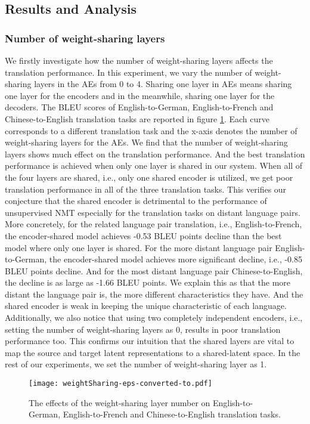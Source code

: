 \documentclass[11pt,a4paper]{article}
\begin{document}
\subsection{Results and Analysis}
\subsubsection{Number of weight-sharing layers}
We firstly investigate how the number of weight-sharing layers affects the translation performance. In this experiment, we vary the number of weight-sharing layers in the AEs from 0 to 4. Sharing one layer in AEs means sharing one layer for the encoders and in the meanwhile, sharing one layer for the decoders. The BLEU scores of English-to-German, English-to-French and Chinese-to-English translation tasks are reported in figure \ref{fig:weightSharingNumber}. Each curve corresponds to a different translation task and the x-axis denotes the number of weight-sharing layers for the AEs. We find that the number of weight-sharing layers shows much effect on the translation performance. And the best translation performance is achieved when only one layer is shared in our system. When all of the four layers are shared, i.e., only one shared encoder is utilized, we get poor translation performance in all of the three translation tasks. This verifies our conjecture that the shared encoder is detrimental to the performance of unsupervised NMT especially for the translation tasks on distant language pairs. More concretely, for the related language pair translation, i.e., English-to-French, the encoder-shared model achieves -0.53 BLEU points decline than the best model where only one layer is shared. For the more distant language pair English-to-German, the encoder-shared model achieves more significant decline, i.e., -0.85 BLEU points decline. And for the most distant language pair Chinese-to-English, the decline is as large as -1.66 BLEU points. We explain this as that the more distant the language pair is, the more different characteristics they have. And the shared encoder is weak in keeping the unique characteristic of each language. Additionally, we also notice that using two completely independent encoders, i.e., setting the number of weight-sharing layers as 0, results in poor translation performance too. This confirms our intuition that the shared layers are vital to map the source and target latent representations to a shared-latent space. In the rest of our experiments, we set the number of weight-sharing layer as 1.

\begin{figure}[htb]
	\begin{center}
		\texttt{[image: weightSharing-eps-converted-to.pdf]}
	\end{center}
	\caption{The effects of the weight-sharing layer number on English-to-German, English-to-French and Chinese-to-English translation tasks.}
    \label{fig:weightSharingNumber}	
\end{figure}
\end{document}
